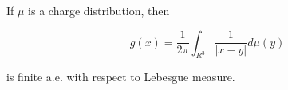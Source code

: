 If $\mu$ is a charge distribution, then

$$g(x) = \frac{1}{2\pi} \int_{R^3} \frac{1}{|x - y|} d\mu(y)$$

is finite a.e. with respect to Lebesgue measure.
